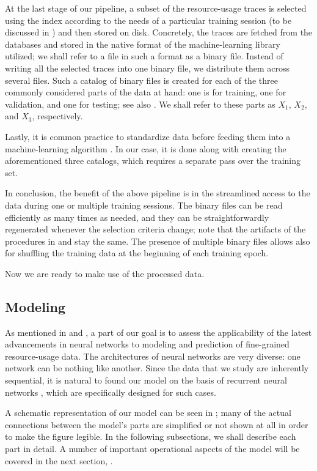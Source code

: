 At the last stage of our pipeline, a subset of the resource-usage traces is
selected using the index according to the needs of a particular training session
(to be discussed in ) and then stored on disk. Concretely, the
traces are fetched from the databases and stored in the native format of the
machine-learning library utilized; we shall refer to a file in such a format as
a binary file. Instead of writing all the selected traces into one binary file,
we distribute them across several files. Such a catalog of binary files is
created for each of the three commonly considered parts \cite{hastie2013} of the
data at hand: one is for training, one for validation, and one for testing; see
also . We shall refer to these parts as $X_1$, $X_2$, and $X_3$,
respectively.

Lastly, it is common practice to standardize data before feeding them into a
machine-learning algorithm \cite{hastie2013}. In our case, it is done along with
creating the aforementioned three catalogs, which requires a separate pass over
the training set.

In conclusion, the benefit of the above pipeline is in the streamlined access to
the data during one or multiple training sessions. The binary files can be read
efficiently as many times as needed, and they can be straightforwardly
regenerated whenever the selection criteria change; note that the artifacts of
the procedures in  and  stay the same. The
presence of multiple binary files allows also for shuffling the training data at
the beginning of each training epoch.

Now we are ready to make use of the processed data.

\subsection{Modeling}

As mentioned in  and , a part of our goal is to
assess the applicability of the latest advancements in neural networks
\cite{goodfellow2016} to modeling and prediction of fine-grained resource-usage
data. The architectures of neural networks are very diverse: one network can be
nothing like another. Since the data that we study are inherently sequential, it
is natural to found our model on the basis of recurrent neural networks
\cite{goodfellow2016}, which are specifically designed for such cases.

A schematic representation of our model can be seen in ; many of the
actual connections between the model's parts are simplified or not shown at all
in order to make the figure legible. In the following subsections, we shall
describe each part in detail. A number of important operational aspects of the
model will be covered in the next section, .

